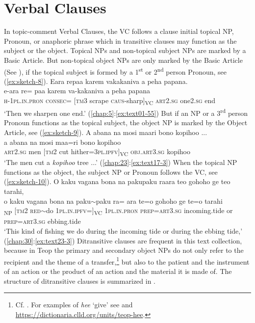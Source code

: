 \documentclass[output=paper]{langscibook}
\begin{document}
\section{Verbal Clauses}\label{sec:verbal}
In topic-comment Verbal Clauses, the VC follows a clause initial topical NP, Pronoun, or anaphoric phrase which in transitive clauses may function as the subject or the object. Topical NPs and non-topical subject NPs are marked by a Basic Article. But non-topical object NPs are only marked by the Basic Article (See ), if the topical subject is formed by a 1\textsuperscript{st} or 2\textsuperscript{nd} person Pronoun, see (\ref{ex:sketch-8}).
\ea\label{ex:sketch-8}
    Eara repaa karem vakakaniva a peha papana.\\
    \gll e-ara	re= paa	karem	va-kakaniva	a	peha	papana\\
    \textsc{h}-1\textsc{pl}.\textsc{in}.\textsc{pron}	\textsc{consec}= [\textsc{tm}3	scrape	\textsc{caus}-sharp]\textsubscript{VC}	\textsc{art}2.\textsc{sg}	one2.\textsc{sg}	end\\
    \glt `Then we sharpen one end.' (\ref{chap:5}:\ref{ex:text01-55})
\z
But if an NP or a 3\textsuperscript{rd} person Pronoun functions as the topical subject, the object NP is marked by the Object Article, see (\ref{ex:sketch-9}).
\ea\label{ex:sketch-9}
    A abana na mosi maari bono kopihoo ...\\
    \gll a	abana	na	mosi	maa=ri	bono	kopihoo\\
    \textsc{art}2.\textsc{sg}	men	[\textsc{tm}2	cut	hither=3\textsc{pl}.\textsc{ipfv}]\textsubscript{VC}	\textsc{obj}.\textsc{art}3.\textsc{sg}	kopihoo\\
    \glt `The men cut a \textit{kopihoo} tree ...' (\ref{chap:23}:\ref{ex:text17-3})
\z
When the topical NP functions as the object, the subject NP or Pronoun follows the VC, see (\ref{ex:sketch-10}).
\ea\label{ex:sketch-10}
    O kaku vagana bona na pakupaku raara teo gohoho ge teo tarahi,\\
    \gll o	kaku	vagana	bona	na	paku{$\sim$}paku	ra=    ara	te=o	gohoho	ge	te=o	tarahi\\
    [\textsc{art}3.\textsc{sg}	kind	fish	\textsc{ana}.\textsc{sg}]\textsubscript{NP}	[\textsc{tm}2	\textsc{red}{$\sim$}do	1\textsc{pl}.\textsc{in}.\textsc{ipfv}=]\textsubscript{VC}    1\textsc{pl}.\textsc{in}.\textsc{pron}	\textsc{prep}=\textsc{art}3.\textsc{sg}	incoming.tide	or	\textsc{prep}=\textsc{art}3.\textsc{sg}	ebbing.tide\\
    \glt `This kind of fishing we do during the incoming tide or during the ebbing tide,' (\ref{chap:30}:\ref{ex:text23-3})
\z
Ditransitive clauses are frequent in this text collection, because in Teop the primary and secondary object NPs do not only refer to the recipient and the theme of a transfer,\footnote{Cf. \textcite[1--2]{Malchukov:2010wb}. For examples of \textit{hee} `give' see \textcite[487--500]{Mosel:2010bh} and \url{https://dictionaria.clld.org/units/teop-hee}.} but also to the patient and the instrument of an action or the product of an action and the material it is made of. The structure of ditransitive clauses is summarized in .
\end{document}
